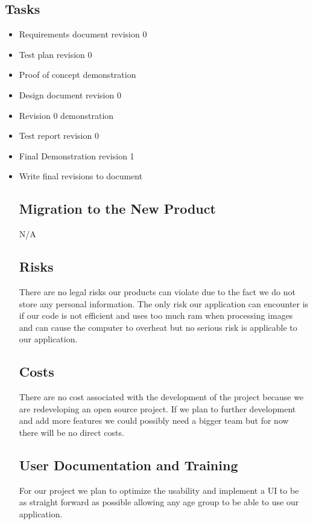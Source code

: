\documentclass[12pt, titlepage]{article}
\begin{document}
\subsection{Tasks}

\begin{itemize}
\item Requirements document revision 0
\item Test plan revision 0
\item Proof of concept demonstration
\item Design document revision 0
\item Revision 0 demonstration
\item Test report revision 0
\item Final Demonstration revision 1  
\item Write final revisions to document


\subsection{Migration to the New Product}

N/A

\subsection{Risks}

There are no legal risks our products can violate due to the fact we do not store any personal information. The only risk our application can encounter is if our code is not efficient and uses too much ram when processing images and can cause the computer to overheat but no serious risk is applicable to our application.

\subsection{Costs}

There are no cost associated with the development of the project because we are redeveloping an open source project. If we plan to further development and add more features we could possibly need a bigger team but for now there will be no direct costs.

\subsection{User Documentation and Training}

For our project we plan to optimize the usability and implement a UI to be as straight forward as possible allowing any age group to be able to use our application.


\end{itemize}
\end{document}
